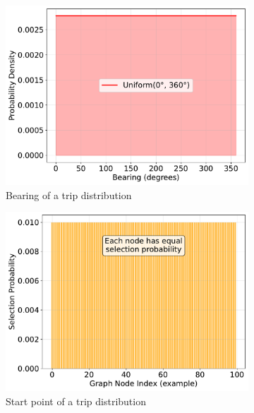 \begin{figure}
\begin{subfigure}{0.49\linewidth}
    \centering
    \includegraphics[width=\linewidth]{./fig/bearing-distribution-no-labels.pdf}
    \caption{Bearing of a trip distribution}
    \label{fig:trip-bearing-distribution}
  \end{subfigure}
  \hfill
  \begin{subfigure}{0.49\linewidth}
    \centering
    \includegraphics[width=\linewidth]{./fig/start-point-distribution-no-labels.pdf}
    \caption{Start point of a trip distribution}
    \label{fig:trip-start-point-distribution}
  \end{subfigure}
  \vfill
  \begin{subfigure}{0.49\linewidth}
    \centering

\end{subfigure}
\end{figure}
